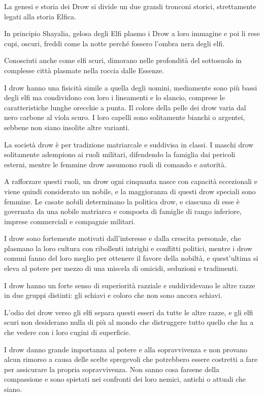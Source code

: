 \documentclass[a4paper,11pt,twoside,openany]{book}
\begin{document}
\label{drow}

La genesi e storia dei Drow si divide un due grandi tronconi storici, strettamente legati alla storia Elfica.

In principio Shayalia, gelosa degli Elfi plasmo i Drow a loro immagine e poi li rese cupi, oscuri, freddi come la notte perché fossero l'ombra nera degli elfi.

Conosciuti anche come elfi scuri, dimorano nelle profondità del sottosuolo in complesse città plasmate nella roccia dalle Essenze.

I drow hanno una fisicità simile a quella degli uomini, mediamente sono più bassi degli elfi ma condividono con loro i lineamenti e lo slancio, comprese le caratteristiche lunghe orecchie a punta. Il colore della pelle dei drow varia dal nero carbone al viola scuro. I loro capelli sono solitamente bianchi o argentei, sebbene non siano insolite altre varianti.

La società drow è per tradizione matriarcale e suddivisa in classi. I maschi drow solitamente adempiono ai ruoli militari, difendendo la famiglia dai pericoli esterni, mentre le femmine drow assumono ruoli di comando e autorità.

A rafforzare questi ruoli, un drow ogni cinquanta nasce con capacità eccezionali e viene quindi considerato un nobile, e la maggioranza di questi drow speciali sono femmine. Le casate nobili determinano la politica drow, e ciascuna di esse è governata da una nobile matriarca e composta di famiglie di rango inferiore, imprese commerciali e compagnie militari.

I drow sono fortemente motivati dall'interesse e dalla crescita personale, che plasmano la loro cultura con ribollenti intrighi e conflitti politici, mentre i drow comuni fanno del loro meglio per ottenere il favore della nobiltà, e quest'ultima si eleva al potere per mezzo di una miscela di omicidi, seduzioni e tradimenti.

I drow hanno un forte senso di superiorità razziale e suddividevano le altre razze in due gruppi distinti: gli schiavi e coloro che non sono ancora schiavi.

L'odio dei drow verso gli elfi separa questi esseri da tutte le altre razze, e gli elfi scuri non desiderano nulla di più al mondo che distruggere tutto quello che ha a che vedere con i loro cugini di superficie.

I drow danno grande importanza al potere e alla sopravvivenza e non provano alcun rimorso a causa delle scelte spregevoli che potrebbero essere costretti a fare per assicurare la propria sopravvivenza. Non sanno cosa farsene della compassione e sono spietati nei confronti dei loro nemici, antichi o attuali che siano.
\end{document}
